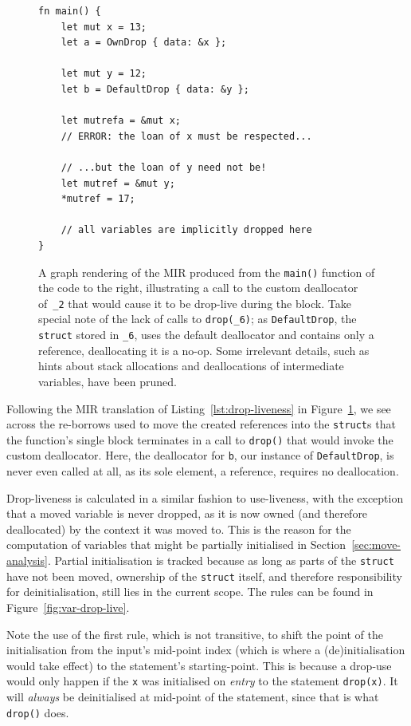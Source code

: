 \documentclass[11pt,a4paper,twoside,openany]{report}
\newenvironment{sourcecode}{\captionsetup{type=listing}}{}
\newcommand{\InRust}[1]{\texttt{#1}}
\renewcommand\_{\textunderscore\allowbreak}
\begin{document}
\begin{figure}
\begin{minipage}{.5\textwidth}
\begin{sourcecode}
\begin{verbatim}
fn main() {
    let mut x = 13;
    let a = OwnDrop { data: &x };

    let mut y = 12;
    let b = DefaultDrop { data: &y };
    
    let mutrefa = &mut x;
    // ERROR: the loan of x must be respected...
    
    // ...but the loan of y need not be!
    let mutref = &mut y;
    *mutref = 17;
    
    // all variables are implicitly dropped here
}
\end{verbatim}
\end{sourcecode}
\end{minipage}
\caption[MIR of a Program Utilising a Custom Deallocator]{A graph rendering of
  the MIR produced from the \InRust{main()} function of the code to the right,
  illustrating a call to the custom deallocator of~\InRust{_2} that would cause
  it to be drop-live during the block. Take special note of the lack of calls to
  \InRust{drop(_6)}; as \InRust{DefaultDrop}, the \InRust{struct} stored in
  \InRust{_6}, uses the default deallocator and contains only a reference,
  deallocating it is a no-op. Some irrelevant details, such as hints about stack
  allocations and deallocations of intermediate variables, have been pruned.}\label{fig:drop-liveness}
\end{figure}

Following the MIR translation of Listing~\ref{lst:drop-liveness} in
Figure~\ref{fig:drop-liveness}, we see across the re-borrows used to move the
created references into the \InRust{struct}s that the function's single block
terminates in a call to \InRust{drop()} that would invoke the custom
deallocator. Here, the deallocator for \InRust{b}, our instance of
\InRust{DefaultDrop}, is never even called at all, as its sole element, a
reference, requires no deallocation.

Drop-liveness is calculated in a similar fashion to use-liveness, with the
exception that a moved variable is never dropped, as it is now owned (and
therefore deallocated) by the context it was moved to. This is the reason for
the computation of variables that might be partially initialised in
Section~\ref{sec:move-analysis}. Partial initialisation is tracked because as
long as parts of the \InRust{struct} have not been moved, ownership of the
\InRust{struct} itself, and therefore responsibility for deinitialisation, still
lies in the current scope. The rules can be found in
Figure~\ref{fig:var-drop-live}.

Note the use of the first rule, which is not transitive, to shift the point of
the initialisation from the input's mid-point index (which is where a
(de)initialisation would take effect) to the statement's starting-point. This is
because a drop-use would only happen if the \InRust{x} was initialised on
\textit{entry} to the statement \InRust{drop(x)}. It will \emph{always} be
deinitialised at mid-point of the statement, since that is what \InRust{drop()}
does.
\end{document}
